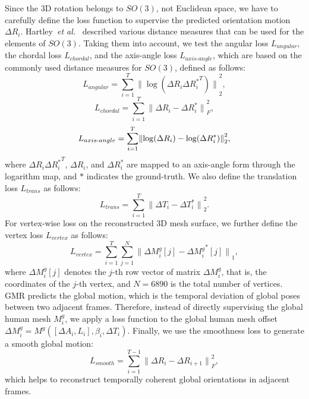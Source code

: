 \documentclass[10pt,twocolumn,letterpaper]{article}
\begin{document}
Since the 3D rotation belongs to $SO(3)$, not Euclidean space, we have to carefully define the loss function to supervise the predicted orientation motion $\Delta{R_{i}}$. Hartley~\textit{et al.}~\cite{hartley2013rotation} described various distance measures that can be used for the elements of $SO(3)$. Taking them into account, we test the angular loss $L_{angular}$, the chordal loss $L_{chordal}$, and the axis-angle loss $L_{axis\text{-}angle}$, which are based on the commonly used distance measures for $SO(3)$, defined as follows:
\begin{equation}
\label{eq: angular loss}
    L_{angular}={\sum^{T}_{i=1}}{\|\log({\Delta{R}_{i}}{{\Delta{R}^{*}_{i}}}^T)\|}^{2}_{2},
\end{equation}
\begin{equation}
\label{eq: chordal loss}
    L_{chordal}={\sum^{T}_{i=1}}{\|{\Delta{R}_{i}}-{\Delta{R}^{*}_{i}}\|}^{2}_{F},
\end{equation}
\begin{equation}
\label{eq: axis-angle loss}
    L_{axis{\text -}angle}={\sum^{T}_{i=1}}{\|{\log(\Delta{R}_{i})}-{\log(\Delta{R}^{*}_{i})}\|}^{2}_{2},
\end{equation}
where ${\Delta{R}_{i}}{{\Delta{R}^{*}_{i}}}^T$, ${\Delta{R}_{i}}$, and ${\Delta{R}^{*}_{i}}$ are mapped to an axis-angle form through the logarithm map, and $*$ indicates the ground-truth. We also define the translation loss $L_{trans}$ as follows:
\begin{equation}
\label{eq: translation motion loss}
    L_{trans}={\sum^{T}_{i=1}}{\|{\Delta{T}_{i}}-{\Delta{T}^{*}_{i}}\|}^{2}_{2}.
\end{equation}
For vertex-wise loss on the reconstructed 3D mesh surface, we further define the vertex loss $L_{vertex}$ as follows:
\begin{equation}
\label{eq: vertex loss}
    L_{vertex}={\sum^{T}_{i=1}}{\sum^{N}_{j=1}}{\|{\Delta{M}^{g}_{i}[j]}-{\Delta{{M}^{g}_{i}}^{*}[j]}\|}_{1},
\end{equation}
where $\Delta{M}^{g}_{i}[j]$ denotes the $j$-th row vector of matrix $\Delta{M}^{g}_{i}$, that is, the coordinates of the $j$-th vertex, and $N=6890$ is the total number of vertices. GMR predicts the global motion, which is the temporal deviation of global poses between two adjacent frames. Therefore, instead of directly supervising the global human mesh $M^{g}_{i}$, we apply a loss function to the global human mesh offset $\Delta{M}^{g}_{i}=M^{g}([\Delta{A}_{i},L_{i}],\beta_{i},\Delta{T}_{i})$. Finally, we use the smoothness loss to generate a smooth global motion:
\begin{equation}
\label{eq: smoothness loss}
    L_{smooth}={\sum^{T-1}_{i=1}}{\|{\Delta{R}_{i}}-{\Delta{R}_{i+1}}\|}^{2}_{F},
\end{equation}
which helps to reconstruct temporally coherent global orientations in adjacent frames.
\end{document}
